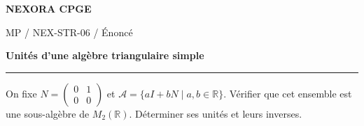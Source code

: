 \documentclass[11pt,a4paper]{article}
\begin{document}
{\small\bfseries\color{nexorablue} NEXORA CPGE}\par
{\small MP / NEX-STR-06 / Énoncé}\par
{\LARGE\bfseries Unités d’une algèbre triangulaire simple}\par
\vspace{0.25em}\hrule\vspace{0.6em}

On fixe $N=\begin{pmatrix}0&1\\0&0\end{pmatrix}$ et $\mathcal A=\{aI+bN\mid a,b\in\mathbb R\}$. Vérifier que cet ensemble est une sous-algèbre de $M_2(\mathbb R)$. Déterminer ses unités et leurs inverses.
\end{document}
